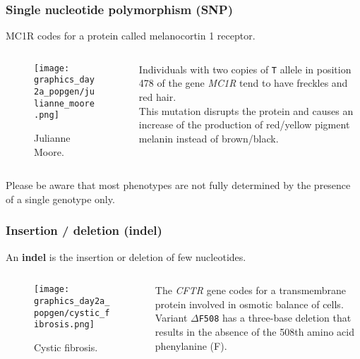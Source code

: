 \documentclass{beamer}
\newcommand{\1}{\ensuremath{\mathbf{1}}}
\begin{document}
%
%
%
\begin{frame}\frametitle{Single nucleotide polymorphism (SNP)}
	MC1R codes for a protein called melanocortin 1 receptor.
	\begin{columns}
	\begin{column}{.4\textwidth}
		\begin{figure}
		\begin{center}
			\texttt{[image: graphics\_day2a\_popgen/julianne\_moore.png]}
		\end{center}
		\caption{Julianne Moore.}
		\end{figure}
	\end{column}
	\begin{column}{.6\textwidth}
		Individuals with two copies of \texttt{T} allele in position 478 of the gene \emph{MC1R} tend to have freckles and red hair.\\[2ex]
		This mutation disrupts the protein and causes an increase of the production of red/yellow pigment melanin instead of brown/black.
	\end{column}
	\end{columns}
	{\tiny Please be aware that most phenotypes are not fully determined by the presence of a single genotype only.}
\end{frame}
%
%
%
\begin{frame}\frametitle{Insertion / deletion (indel)}
	An \textbf{indel} is the insertion or deletion of few nucleotides.
	\begin{columns}
	\begin{column}{.4\textwidth}
		\begin{figure}
		\begin{center}
			\texttt{[image: graphics\_day2a\_popgen/cystic\_fibrosis.png]}
		\end{center}
		\caption{Cystic fibrosis.}
		\end{figure}
	\end{column}
	\begin{column}{.6\textwidth}
		The \emph{CFTR} gene codes for a transmembrane protein involved in osmotic balance of cells.\\[2ex]
		Variant \texttt{$\Delta$F508} has a three-base deletion that results in the absence of the 508th amino acid phenylanine (F).
	\end{column}
	\end{columns}
\end{frame}
\end{document}

